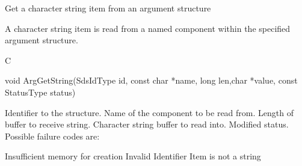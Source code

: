 \begin{manroutinedescription}
      Get a character string item from an argument structure

      A character string item is read from a named component within the
      specified argument structure.
 
      C

      void ArgGetString(SdsIdType id, const char *name, long len,char *value, %
const StatusType {\mantt{*}}  status)
 
\begin{manparametertable}
 Identifier to the structure.
 Name of the component to be read %
from.
  Length of buffer to receive string.
 Character string buffer to read %
into.
 Modified status. Possible %
failure codes are:
\end{manparametertable}
\begin{mantwocolumntable}
Insufficient memory for creation
Invalid Identifier
Item is not a string
\end{mantwocolumntable}
\end{manroutinedescription}

